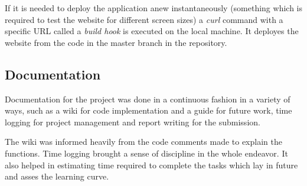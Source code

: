 If it is needed to deploy the application anew instantaneously (something which
is required to test the website for different screen sizes) a \emph{curl}
command with a specific URL called a \emph{build hook} is executed on the local
machine.  It deployes the website from the code in the master branch in the
repository.


\subsection{Documentation}
Documentation for the project was done in a continuous fashion in a variety of
ways, such as a wiki for code implementation and a guide for future work, time
logging for project management and report writing for the submission. 

The wiki was informed heavily from the code comments made to explain the
functions. Time logging brought a sense of discipline in the whole endeavor.
It also helped in estimating time required to complete the tasks which lay in
future and asses the learning curve.
